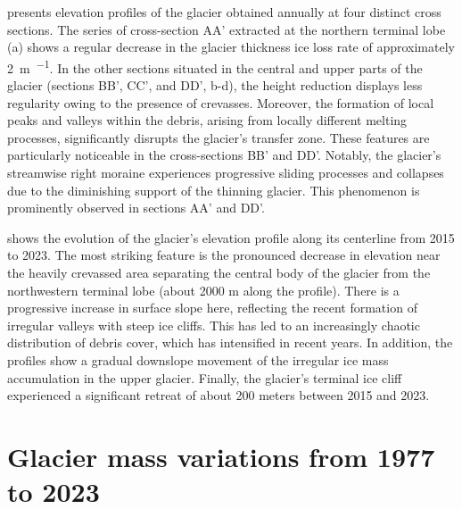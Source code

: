  presents elevation profiles of the glacier obtained annually at four distinct cross sections.
The series of cross-section AA' extracted at the northern terminal lobe (a) shows a regular decrease in the glacier thickness
ice loss rate of approximately \qty{2}{\meter\per\year}.
In the other sections situated in the central and upper parts of the glacier (sections BB', CC', and DD', b-d), 
the height reduction displays less regularity owing to the presence of crevasses.
Moreover, the formation of local peaks and valleys within the debris, arising from locally different melting processes, significantly disrupts the glacier's transfer zone. 
These features are particularly noticeable in the cross-sections BB' and DD'.
Notably, the glacier's streamwise right moraine experiences progressive sliding processes and collapses due to the diminishing support of the thinning glacier. 
This phenomenon is prominently observed in sections AA' and DD'.

 shows the evolution of the glacier's elevation profile along its centerline from 2015 to 2023.
The most striking feature is the pronounced decrease in elevation near the heavily crevassed area separating the central body of the glacier from the northwestern terminal lobe (about 2000 m along the profile).
There is a progressive increase in surface slope here, reflecting the recent formation of irregular valleys with steep ice cliffs. 
This has led to an increasingly chaotic distribution of debris cover, which has intensified in recent years. 
In addition, the profiles show a gradual downslope movement of the irregular ice mass accumulation in the upper glacier. 
Finally, the glacier's terminal ice cliff experienced a significant retreat of about 200 meters between 2015 and 2023.

\section{Glacier mass variations from 1977 to 2023}


